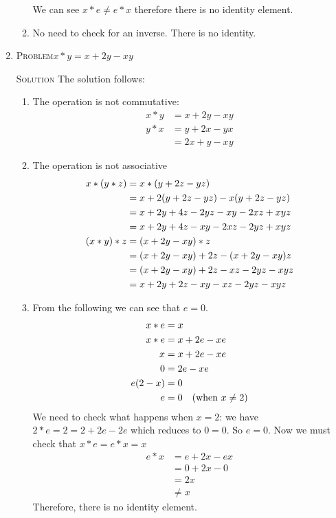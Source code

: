 \documentclass[draft,twoside]{amsart}
\newcommand{\Solution}{\textsc{Solution}\xspace}
\newcommand{\Problem}{\textsc{Problem}\xspace}
\begin{document}
\begin{enumerate}
\begin{enumerate}
      We can see $x*e \ne e*x$ therefore there is no identity element.

      \item No need to check for an inverse. There is no identity.
   \end{enumerate}

   \item \Problem $x * y = x + 2y - xy$

   \noindent \Solution The solution follows:

   \begin{enumerate}
      
      \item The operation is not commutative: 
      \begin{align*}
         x * y & = x + 2y - xy \\
	 y * x & = y + 2x - yx \\
	       & = 2x + y - xy 
      \end{align*}


      \item The operation is not associative
      \begin{align*}
         x * (y * z) & = x * (y + 2z - yz)                          \\
	             & = x + 2(y + 2z - yz) - x(y + 2z - yz) \notag \\
		     & = x + 2y + 4z - 2yz - xy - 2xz + xyz  \notag \\
		     & = x + 2y + 4z - xy - 2xz - 2yz + xyz  \notag \\
	 (x * y) * z & = (x + 2y - xy) * z                          \\
	             & = (x + 2y - xy) + 2z - (x + 2y - xy)z \notag \\
		     & = (x + 2y - xy) + 2z - xz - 2yz - xyz \notag \\
		     & = x + 2y + 2z - xy - xz - 2yz - xyz   \notag
      \end{align*}

      \item From the following we can see that $e=0$. 
      \begin{align*}
         x * e & = x                  \\
	 x * e & = x + 2e - xe        \\
	     x & = x + 2e - xe \notag \\
	     0 & =     2e - xe \notag \\
	e(2-x) & = 0           \notag \\
	     e & = 0 \quad\text{(when $x \ne 2$)} \notag 
      \end{align*}
      We need to check what happens when $x = 2$: we have 
      $2*e=2=2+2e-2e$ which reduces to $0 = 0$. So $e=0$.
      Now we must check that $x*e=e*x=x$
      \begin{align*}
         e * x & = e + 2x - ex      \\
	       & = 0 + 2x - 0       \\
	       & = 2x               \\
	       & \ne x              
      \end{align*}
      Therefore, there is no identity element.


\end{enumerate}
\end{enumerate}
\end{document}
